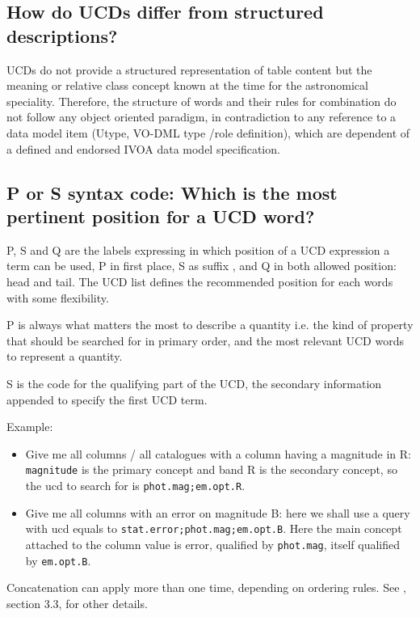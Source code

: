 \documentclass[11pt,a4paper]{ivoa}
\begin{document}
\subsection{How do UCDs differ from structured descriptions?}

UCDs do not provide a structured representation of table content but the meaning or relative class 
concept known at the time for the astronomical speciality. Therefore, the structure of words and 
their rules for combination do not follow any object oriented paradigm, in contradiction to any 
reference to a data model item (Utype, VO-DML type /role definition), which are dependent of a 
defined and endorsed IVOA data model specification.

\subsection{P or S syntax code: Which is the most pertinent position for a UCD word?}
P, S and Q are the labels expressing in which position of a UCD expression a term can be used, P 
in first place, S as suffix , and Q in both allowed position: head and tail. The UCD list defines 
the recommended position for each words with some flexibility.

P is always what matters the most to describe a quantity i.e. the kind of property that should be 
searched for in primary order, and the most relevant UCD words to represent a quantity.

S is the code for the qualifying part of the UCD, the secondary information appended to specify 
the first UCD term.

Example:
\begin{itemize}
\item Give me all columns / all catalogues with a column having a magnitude in R: {\tt magnitude} 
is the primary concept and band R is the secondary concept, so the ucd to search for is 
{\tt phot.mag;em.opt.R}.
\item Give me all columns with an error on magnitude B: here we shall use a query with ucd 
equals to {\tt stat.error;phot.mag;em.opt.B}. Here the main concept attached to the column 
value is error, qualified by {\tt phot.mag}, itself qualified by {\tt em.opt.B}.
\end{itemize}
Concatenation can apply more than one time, depending on ordering rules. See \citet{std:UCD}, section 3.3, 
for other details.
\end{document}
